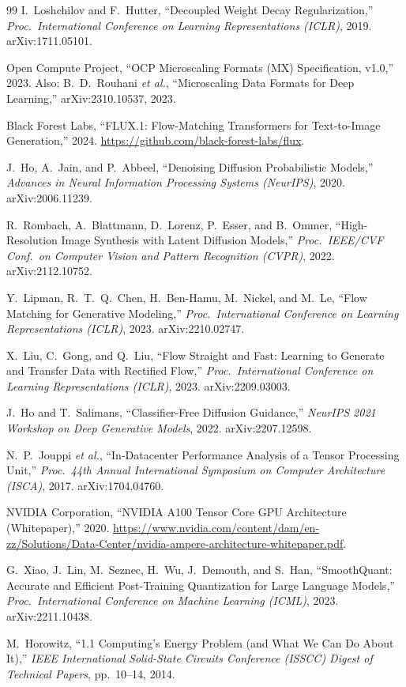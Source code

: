 \documentclass[11pt]{report}
\begin{document}
\begin{thebibliography}{99}
I.~Loshchilov and F.~Hutter,
``Decoupled Weight Decay Regularization,''
\emph{Proc.\ International Conference on Learning Representations (ICLR)}, 2019.
arXiv:1711.05101.

Open Compute Project,
``OCP Microscaling Formats (MX) Specification, v1.0,''
2023. Also: B.~D.~Rouhani \emph{et al.}, ``Microscaling Data Formats for Deep
Learning,'' arXiv:2310.10537, 2023.

Black Forest Labs,
``FLUX.1: Flow-Matching Transformers for Text-to-Image Generation,''
2024. \url{https://github.com/black-forest-labs/flux}.

J.~Ho, A.~Jain, and P.~Abbeel,
``Denoising Diffusion Probabilistic Models,''
\emph{Advances in Neural Information Processing Systems (NeurIPS)}, 2020.
arXiv:2006.11239.

R.~Rombach, A.~Blattmann, D.~Lorenz, P.~Esser, and B.~Ommer,
``High-Resolution Image Synthesis with Latent Diffusion Models,''
\emph{Proc.\ IEEE/CVF Conf.\ on Computer Vision and Pattern Recognition (CVPR)},
2022. arXiv:2112.10752.

Y.~Lipman, R.~T.~Q.~Chen, H.~Ben-Hamu, M.~Nickel, and M.~Le,
``Flow Matching for Generative Modeling,''
\emph{Proc.\ International Conference on Learning Representations (ICLR)}, 2023.
arXiv:2210.02747.

X.~Liu, C.~Gong, and Q.~Liu,
``Flow Straight and Fast: Learning to Generate and Transfer Data with
Rectified Flow,''
\emph{Proc.\ International Conference on Learning Representations (ICLR)}, 2023.
arXiv:2209.03003.

J.~Ho and T.~Salimans,
``Classifier-Free Diffusion Guidance,''
\emph{NeurIPS 2021 Workshop on Deep Generative Models}, 2022.
arXiv:2207.12598.

N.~P.~Jouppi \emph{et al.},
``In-Datacenter Performance Analysis of a Tensor Processing Unit,''
\emph{Proc.\ 44th Annual International Symposium on Computer Architecture
(ISCA)}, 2017. arXiv:1704.04760.

NVIDIA Corporation,
``NVIDIA A100 Tensor Core GPU Architecture (Whitepaper),''
2020.
\url{https://www.nvidia.com/content/dam/en-zz/Solutions/Data-Center/nvidia-ampere-architecture-whitepaper.pdf}.

G.~Xiao, J.~Lin, M.~Seznec, H.~Wu, J.~Demouth, and S.~Han,
``SmoothQuant: Accurate and Efficient Post-Training Quantization for Large
Language Models,''
\emph{Proc.\ International Conference on Machine Learning (ICML)}, 2023.
arXiv:2211.10438.

M.~Horowitz,
``1.1 Computing's Energy Problem (and What We Can Do About It),''
\emph{IEEE International Solid-State Circuits Conference (ISSCC) Digest of
Technical Papers}, pp.~10--14, 2014.

\end{thebibliography}
\end{document}
